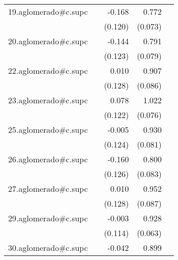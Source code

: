 {\begin{longtable}{l*{4}{D{.}{.}{-1}}}
\addlinespace
19.aglomerado#c.supc&                     &      -0.168         &       0.772\sym{***}&                     \\
            &                     &     (0.120)         &     (0.073)         &                     \\
\addlinespace
20.aglomerado#c.supc&                     &      -0.144         &       0.791\sym{***}&                     \\
            &                     &     (0.123)         &     (0.079)         &                     \\
\addlinespace
22.aglomerado#c.supc&                     &       0.010         &       0.907\sym{***}&                     \\
            &                     &     (0.128)         &     (0.086)         &                     \\
\addlinespace
23.aglomerado#c.supc&                     &       0.078         &       1.022\sym{***}&                     \\
            &                     &     (0.122)         &     (0.076)         &                     \\
\addlinespace
25.aglomerado#c.supc&                     &      -0.005         &       0.930\sym{***}&                     \\
            &                     &     (0.124)         &     (0.081)         &                     \\
\addlinespace
26.aglomerado#c.supc&                     &      -0.160         &       0.800\sym{***}&                     \\
            &                     &     (0.126)         &     (0.083)         &                     \\
\addlinespace
27.aglomerado#c.supc&                     &       0.010         &       0.952\sym{***}&                     \\
            &                     &     (0.128)         &     (0.087)         &                     \\
\addlinespace
29.aglomerado#c.supc&                     &      -0.003         &       0.928\sym{***}&                     \\
            &                     &     (0.114)         &     (0.063)         &                     \\
\addlinespace
30.aglomerado#c.supc&                     &      -0.042         &       0.899\sym{***}&                     \\

\end{longtable}}
